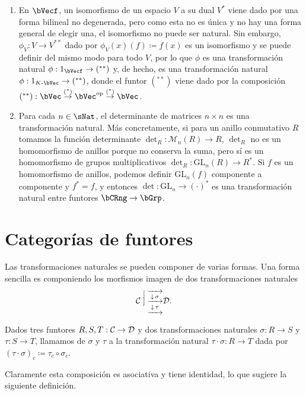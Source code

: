 \begin{example}\label{ex:nattrans}\;
  \begin{enumerate}
  \item En $\bVecf$, un isomorfismo de un espacio $V$ a su dual $V^*$ viene dado
    por una forma bilineal no degenerada, pero como esta no es única y no hay
    una forma general de elegir una, el isomorfismo no puede ser natural. Sin
    embargo, $\phi_V:V\to V^{**}$ dado por $\phi_V(x)(f)\coloneqq f(x)$ es un
    isomorfismo y se puede definir del mismo modo para todo $V$, por lo que
    $\phi$ es una transformación natural $\phi:1_{\bVecf}\to(^{**})$ y, de
    hecho, es una transformación natural $\phi:1_{K\dash\bVec}\to(^{**})$, donde
    el funtor $(^{**})$ viene dado por la composición
    $(^{**}):\bVec\overset{(^*)}{\to}\dual{\bVec}\overset{(^*)}{\to}\bVec$.
  \item Para cada $n\in\sNat$, el determinante de matrices $n\times n$ es una
    transformación natural. Más concretamente, si para un anillo conmutativo $R$
    tomamos la función determinante $\det_R:{\mathcal{M}}_n(R)\to R$, $\det_R$
    no es un homomorfismo de anillos porque no conserva la suma, pero sí es un
    homomorfismo de grupos multiplicativos $\det_R:\text{GL}_n(R)\to R^*$. Si
    $f$ es un homomorfismo de anillos, podemos definir $\text{GL}_n(f)$
    componente a componente y $f^*=f$, y entonces $\det:\text{GL}_n\to(\cdot)^*$
    es una transformación natural entre funtores $\bCRng\to\bGrp$.
  \end{enumerate}
\end{example}

\section{Categorías de funtores}

Las transformaciones naturales se pueden componer de varias formas. Una forma
sencilla es componiendo los morfismos imagen de dos transformaciones naturales
\[\cC\nattwos{\sigma}{\tau}\cD.\]

\begin{definition}
  Dados tres funtores $R,S,T:\mathcal{C}\to\mathcal{D}$ y dos transformaciones naturales
  $\sigma:R\to S$ y $\tau:S\to T$, llamamos  de
  $\sigma$ y $\tau$ a la transformación natural $\tau\cdot\sigma:R\to T$ dada
  por $(\tau\cdot\sigma)_c\coloneqq \tau_c\circ \sigma_c$.
\end{definition}

Claramente esta composición es asociativa y tiene identidad, lo que sugiere la
siguiente definición.

